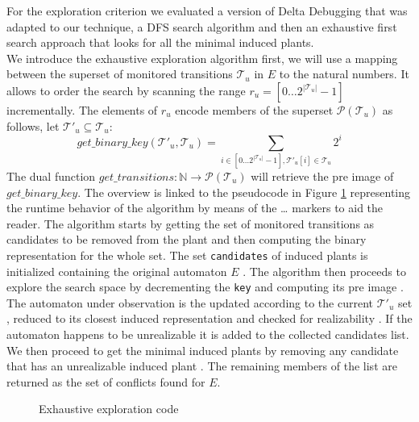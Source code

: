 For the exploration criterion we evaluated a version of Delta Debugging
that was adapted to our technique, a DFS search algorithm
and then an exhaustive first search approach that looks for all the
minimal induced plants.\\
We introduce the exhaustive exploration algorithm first,
we will use a mapping between the superset
of monitored transitions $\mathcal{T}_u$ in $E$ to the natural numbers.  
It allows to order the search by scanning the range 
$r_u = [0\ldots 2^{|\mathcal{T}_u|}-1]$ incrementally.  The elements
of $r_u$ encode members of the superset $\mathcal{P}(\mathcal{T}_u)$
as follows, let $\mathcal{T}'_u \subseteq \mathcal{T}_u$:
\[
get\_binary\_key(\mathcal{T}'_u, \mathcal{T}_u) = 
\sum\limits_{i \in [0\ldots 2^{|\mathcal{T}_u|}-1], \mathcal{T}'_u[i] \in \mathcal{T}_u}2^i
\]
The dual function $get\_transitions:\mathbb{N} \rightarrow \mathcal{P}(\mathcal{T}_u)$ will retrieve the pre image of $get\_binary\_key$.
The overview is linked to the pseudocode
in Figure \ref{fig:exhaustive-code} representing the runtime behavior of the
algorithm by means of the  \ldots {} markers to aid the reader.
The algorithm starts by getting the set of monitored transitions as 
candidates to be removed from the plant  and then computing the 
binary representation for the whole set.  The set \texttt{candidates} of
induced plants is initialized containing the original automaton $E$ .
The algorithm then proceeds to explore the search space by decrementing the 
\texttt{key}  and computing its pre image .  
The automaton under observation is the updated according to the current
$\mathcal{T}'_u$ set , reduced to its closest induced representation
and checked for realizability .  If the automaton happens to be 
unrealizable it is added to the collected candidates list.  We then proceed
to get the minimal induced plants by removing any candidate that has an 
unrealizable induced plant .  The remaining members of the list
are returned as the set of conflicts found for $E$.
\begin{figure}[ht]
  \begin{center}
     
    \caption{Exhaustive exploration code}
    \label{fig:exhaustive-code}
  \end{center}
\end{figure}